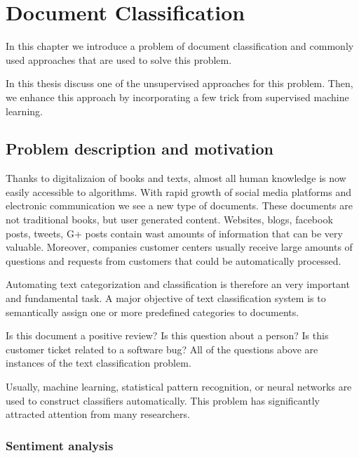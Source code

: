 \chapter{Document Classification}

    In this chapter we introduce a problem of document classification and commonly used approaches that are used to solve this problem.
    
    In this thesis discuss one of the unsupervised approaches for this problem.
    Then, we enhance this approach by incorporating a few trick from supervised machine learning.

\section{Problem description and motivation} \label{sec:problem}

    Thanks to digitalizaion of books and texts, almost all human knowledge is now easily accessible to algorithms. 
    With rapid growth of social media platforms and electronic communication we see a new type of documents.
    These documents are not traditional books, but user generated content.
    Websites, blogs, facebook posts, tweets, G+ posts contain wast amounts of information that can be very valuable.
    Moreover, companies customer centers usually receive large amounts of questions and requests from customers that could be automatically processed.
    
    Automating text categorization and classification is therefore an very important and fundamental task. 
    A major objective of text classification system is to semantically assign one or more predefined categories to documents.
    
    Is this document a positive review? 
    Is this question about a person?
    Is this customer ticket related to a software bug?
    All of the questions above are instances of the text classification problem.
    
    Usually, machine learning, statistical pattern recognition, or neural networks are used to construct classifiers automatically.
    This problem has significantly attracted attention from many researchers.

    \subsection{Sentiment analysis}
    
    \* %
    
